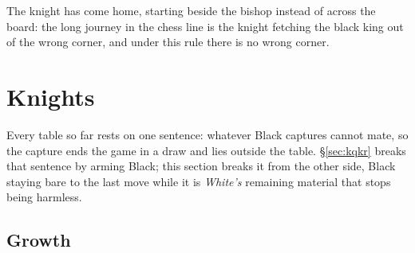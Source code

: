\documentclass[10pt]{article}
\begin{document}
\medskip
\noindent
\begin{minipage}[t]{0.32\textwidth}
\end{minipage}\hfill
\begin{minipage}[t]{0.32\textwidth}
\end{minipage}\hfill
\begin{minipage}[t]{0.32\textwidth}\vspace{0pt}\small
The knight has come home, starting beside the bishop instead of across the
board: the long journey in the chess line is the knight fetching the black king
out of the wrong corner, and under this rule there is no wrong corner.
\end{minipage}

\section{Knights}\label{sec:knights}

\noindent
Every table so far rests on one sentence: whatever Black captures cannot mate,
so the capture ends the game in a draw and lies outside the table.
\S\ref{sec:kqkr} breaks that sentence by arming Black; this section breaks it
from the other side, Black staying bare to the last move while it is
\emph{White's} remaining material that stops being harmless.

\subsection{Growth}\label{sub:knights-growth}
\end{document}
